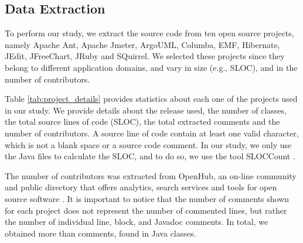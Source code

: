 \subsection{Data Extraction} %
\label{sub:data_extraction}

To perform our study, we extract the source code from ten open source projects, namely Apache Ant, Apache Jmeter, ArgoUML, Columba, EMF, Hibernate, JEdit, JFreeChart, JRuby and SQuirrel. We selected these projects since they belong to different application domains, and vary in size (e.g., SLOC), and in the number of contributors. 

Table \ref{tab:project_details} provides statistics about each one of the projects used in our study. We provide details about the release used, the number of classes, the total source lines of code (SLOC), the total extracted comments and the number of contributors. A source line of code contain at least one valid character, which is not a blank space or a source code comment. In our study, we only use the Java files to calculate the SLOC, and to do so, we use the tool SLOCCount \cite{wheeler2004:home}. 

The number of contributors was extracted from OpenHub, an on-line community and public directory that offers analytics, search services and tools for open source software \cite{Openhub:home}. It is important to notice that the number of comments shown for each project does not represent the number of commented lines, but rather the number of individual line, block, and Javadoc comments. In total, we obtained more than \todo{} comments, found in \todo{} Java classes.

